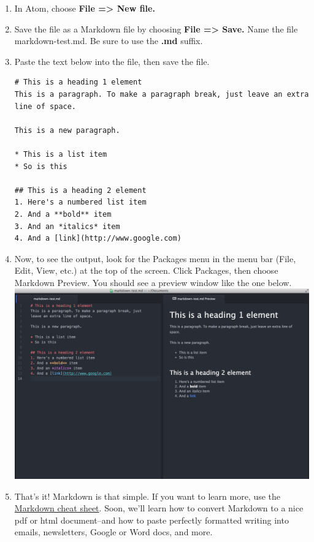 \documentclass[]{book}
\theoremstyle{definition}
\theoremstyle{definition}
\theoremstyle{definition}
\theoremstyle{remark}
\begin{document}
\begin{enumerate}
\def\labelenumi{\arabic{enumi}.}
\item
  In Atom, choose \textbf{File =\textgreater{} New file.}
\item
  Save the file as a Markdown file by choosing \textbf{File
  =\textgreater{} Save.} Name the file markdown-test.md. Be sure to use
  the \textbf{.md} suffix.
\item
  Paste the text below into the file, then save the file.

\begin{verbatim}
# This is a heading 1 element  
This is a paragraph. To make a paragraph break, just leave an extra line of space.  

This is a new paragraph.  

* This is a list item  
* So is this  

## This is a heading 2 element  
1. Here's a numbered list item  
2. And a **bold** item  
3. And an *italics* item  
4. And a [link](http://www.google.com)
\end{verbatim}
\item
  Now, to see the output, look for the Packages menu in the menu bar
  (File, Edit, View, etc.) at the top of the screen. Click Packages,
  then choose Markdown Preview. You should see a preview window like the
  one below.\\
  \includegraphics{markdown.png}
\item
  That's it! Markdown is that simple. If you want to learn more, use the
  \href{https://guides.github.com/pdfs/markdown-cheatsheet-online.pdf}{Markdown
  cheat sheet}. Soon, we'll learn how to convert Markdown to a nice pdf
  or html document--and how to paste perfectly formatted writing into
  emails, newsletters, Google or Word docs, and more.
\end{enumerate}
\end{document}
